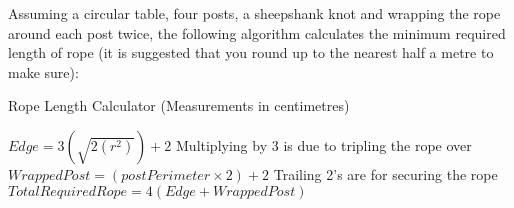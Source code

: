Assuming a circular table, four posts, a sheepshank knot and wrapping the rope
around each post twice, the following algorithm calculates the minimum required
length of rope (it is suggested that you round up to the nearest half a metre 
to make sure):

\begin{algorithm}
  \caption{Rope Length Calculator (Measurements in centimetres) }
  \label{desSysRope}
  \begin{algorithmic}[1]
    \State $ Edge = 3(\sqrt{2(r^{2} ) } ) + 2 $
    \Comment Multiplying by 3 is due to tripling the rope over
    \State $ WrappedPost = (postPerimeter \times 2) + 2 $
    \Comment Trailing 2's are for securing the rope
    \State $ TotalRequiredRope = 4(Edge + WrappedPost) $
  \end{algorithmic}
\end{algorithm}